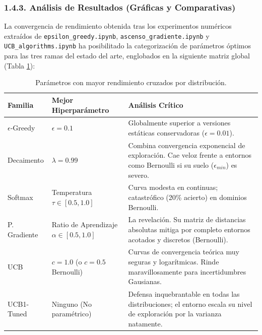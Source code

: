 \subsubsection{1.4.3. Análisis de Resultados (Gráficas y
Comparativas)}\label{anuxe1lisis-de-resultados-gruxe1ficas-y-comparativas}

La convergencia de rendimiento obtenida tras los experimentos numéricos
extraídos de \texttt{epsilon\_greedy.ipynb},
\texttt{ascenso\_gradiente.ipynb} y \texttt{UCB\_algorithms.ipynb} ha
posibilitado la categorización de parámetros óptimos para las tres ramas
del estado del arte, englobados en la siguiente matriz global (Tabla
\ref{tab:Resultados}):

\begin{table}[t]
\centering
\caption{Parámetros con mayor rendimiento cruzados por distribución.}
\label{tab:Resultados}
\begin{tabular}{|l|l|p{7cm}|}
\hline
\textbf{Familia} & \textbf{Mejor Hiperparámetro} & \textbf{Análisis Crítico} \\ \hline
$\epsilon$-Greedy   & $\epsilon = 0.1$                                  & Globalmente superior a versiones estáticas conservadoras ($\epsilon=0.01$). \\ \hline
Decaimento      & $\lambda = 0.99$                                  & Combina convergencia exponencial de exploración. Cae veloz frente a entornos como Bernoulli si su suelo ($\epsilon_{min}$) es severo.\\ \hline
Softmax         & Temperatura $\tau \in [0.5, 1.0]$                 & Curva modesta en continuas; catastrófico (20\% acierto) en dominios Bernoulli. \\ \hline
P. Gradiente    & Ratio de Aprendizaje $\alpha \in [0.5, 1.0]$      & La revelación. Su matriz de distancias absolutas mitiga por completo entornos acotados y discretos (Bernoulli).  \\ \hline
UCB             & $c = 1.0$ (o $c=0.5$ Bernoulli)                    & Curvas de convergencia teórica muy seguras y logarítmicas. Rinde maravillosamente para incertidumbres Gausianas. \\ \hline
UCB1-Tuned      & Ninguno (No paramétrico)                          & Defensa inquebrantable en todas las distribuciones; el entorno escala su nivel de exploración por la varianza natamente. \\ \hline
\end{tabular}
\end{table}

